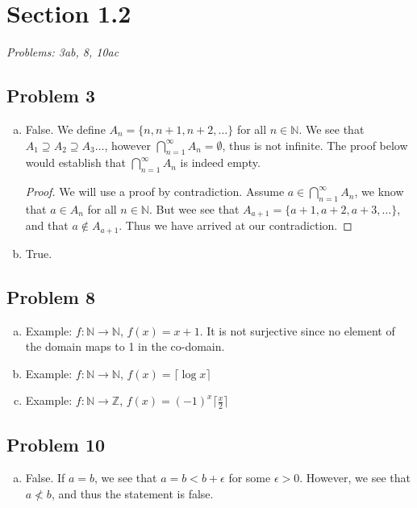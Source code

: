 \documentclass[12pt]{article}
\begin{document}

\section*{Section 1.2}
\textit{Problems: 3ab, 8, 10ac }

\subsection*{Problem 3}
\begin{enumerate}[a).]
    \item {
    False.
    We define $A_n = \{n, n+1, n+2, \dots\}$ for all $n \in \mathbb{N}$. 
    We see that $A_1 \supseteq A_2 \supseteq A_3 \dots$, however $\bigcap_{n=1}^{\infty}A_n = \emptyset$, thus is not infinite.
    The proof below would establish that $\bigcap_{n=1}^{\infty}A_n$ is indeed empty. 

    \begin{proof}
        We will use a proof by contradiction. 
        Assume $ a \in \bigcap_{n=1}^{\infty}A_n$, we know that $a \in A_n$ for all $n \in \mathbb{N}$.
        But wee see that $A_{a+1} = \{a+1, a+2, a+3, \dots\}$, and that $a \notin A_{a+1}$. 
        Thus we have arrived at our contradiction.
    \end{proof}
    }
    \item {
    True.
    }

\end{enumerate}

\subsection*{Problem 8}

\begin{enumerate}[a).]
    \item {
        Example: $f: \mathbb{N} \rightarrow \mathbb{N}$, $f(x) = x+1$.
        It is not surjective since no element of the domain maps to 1 in the co-domain. 
    }
    \item {
    Example: $f: \mathbb{N} \rightarrow \mathbb{N}$, $f(x) = \lceil  \log{x} \rceil$
    }
    \item {
    Example: $f: \mathbb{N} \rightarrow \mathbb{Z}$, $f(x) = (-1)^{x}{\lceil \frac{x}{2}\rceil}$
    }
\end{enumerate}

\subsection*{Problem 10}
\begin{enumerate}[a).]
    \item {
        False.
        If $a = b$, we see that $a = b < b + \epsilon$ for some $\epsilon > 0$. 
        However, we see that $a \nless b$, and thus the statement is false. 
    }

\end{enumerate}
\end{document}
